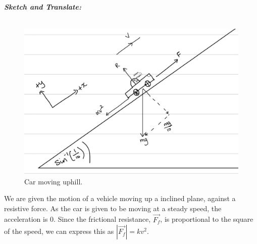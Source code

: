 %
%
%


\begin{subquestions}
	
\subquestion

\textbf{\textit{Sketch and Translate:}} \\ \\
\begin{figure}[H]
	\begin{center}
		\includegraphics[scale=0.25]{../2009/figures/2009q5-1}
		\caption{\label{2009:q5:Sketch1} Car moving uphill.}
	\end{center}
\end{figure}
We are given the motion of a vehicle moving up a inclined plane, against a resistive force. As the car is given to be moving at a steady speed, the acceleration is 0. Since the frictional resistance, $\vec{F_f}$, is proportional to the square of the speed, we can express this as $|\vec{F_f}| = kv^2$.
	


\end{subquestions}
